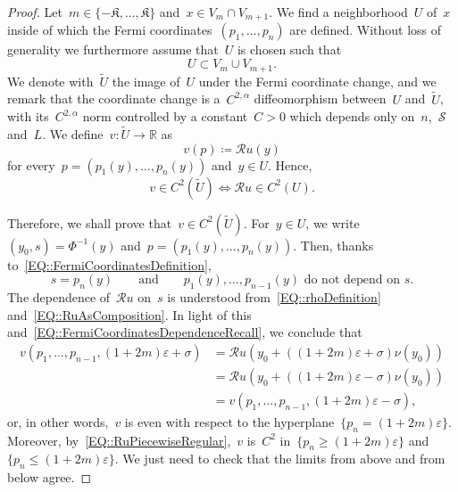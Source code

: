 \documentclass[12pt,a4paper]{amsart}
\numberwithin{equation}{section}
\theoremstyle{definition}
\theoremstyle{remark}
\newcommand{\R}{\mathbb{R}}
\newcommand{\eps}{\varepsilon}
\renewcommand{\leq}{\leqslant}
\renewcommand{\geq}{\geqslant}
\begin{document}
\begin{proof}
    Let~$m \in \{-\mathfrak{K},\dots,\mathfrak{K}\}$ and~$x \in V_m \cap V_{m+1}$. We find a neighborhood~$U$ of~$x$ inside of which the Fermi coordinates~$(p_1, \dots, p_n)$ are defined. Without loss of generality we furthermore assume that~$U$ is chosen such that
    \begin{equation}
        U \subset V_m \cup V_{m+1}.
    \end{equation}
    We denote with~$\tilde{U}$ the image of~$U$ under the Fermi coordinate change, and we remark that the coordinate change is a~$C^{2,\alpha}$ diffeomorphism between~$U$ and~$\tilde{U}$, with its~$C^{2,\alpha}$ norm controlled by a constant~$C>0$ which depends only on~$n$,~$\mathcal{S}$ and~$L$. We define~$v \colon \tilde{U} \to \R$ as
    \begin{equation}\label{EQ::vIsRuInFermiCoordinates}
        v(p) \coloneq \mathcal{R}u(y)
    \end{equation}
    for every~$p = (p_1(y),\dots,p_n(y))$ and~$y \in U$. Hence,
    \begin{equation}\label{EQ::vRegularIffRuRegular}
        v \in C^2(\tilde{U}) \iff \mathcal{R}u \in C^2 (U).
    \end{equation}

    Therefore, we shall prove that~$v \in C^2(\tilde{U})$. For~$y \in U$, we write~$(y_0, s) = \Phi^{-1}(y)$ and~$p = (p_1(y),\dots,p_n(y))$. Then, thanks to~\eqref{EQ::FermiCoordinatesDefinition},
    \begin{equation}\label{EQ::FermiCoordinatesDependenceRecall}
        s = p_n(y)\qquad \text{and}\qquad p_1(y),\dots,p_{n-1}(y) \text{ do not depend on }s.
    \end{equation}
    The dependence of~$\mathcal{R}u$ on~$s$ is understood from~\eqref{EQ::rhoDefinition} and~\eqref{EQ::RuAsComposition}. In light of this and~\eqref{EQ::FermiCoordinatesDependenceRecall}, we conclude that
    \begin{equation}\label{EQ::vIsEvenInNthFermiCoordinate}
        \begin{split}
            v(p_1, \dots, p_{n-1}, (1+2m)\eps + \sigma) &= \mathcal{R}u(y_0 + ((1+2m)\eps + \sigma)\nu(y_0))\\
            &= \mathcal{R}u(y_0 + ((1+2m)\eps - \sigma)\nu(y_0))\\
            &= v(p_1, \dots, p_{n-1}, (1+2m)\eps - \sigma),
        \end{split}
    \end{equation}
    or, in other words,~$v$ is even with respect to the hyperplane~$\{p_n = (1+2m)\eps\}$. Moreover, by~\eqref{EQ::RuPiecewiseRegular},~$v$ is~$C^2$ in~$\{p_n \geq (1+2m)\eps\}$ and~$\{p_n \leq (1+2m)\eps\}$. We just need to check that the limits from above and from below agree.


\end{proof}
\end{document}
